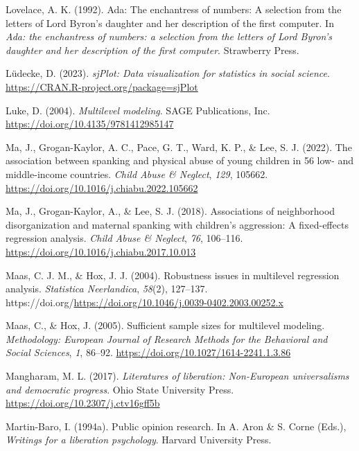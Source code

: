 \documentclass[
  letterpaper,
  DIV=11,
  numbers=noendperiod]{scrreprt}
\newlength{\cslhangindent}
\newenvironment{CSLReferences}[2] %
 {\begin{list}{}{%
  \setlength{\itemindent}{0pt}
  \setlength{\leftmargin}{0pt}
  \setlength{\parsep}{0pt}
  \ifodd #1
   \setlength{\leftmargin}{\cslhangindent}
   \setlength{\itemindent}{-1\cslhangindent}
  \fi
  \setlength{\itemsep}{#2\baselineskip}}}
 {\end{list}}
\begin{document}
\begin{CSLReferences}{1}{0}
Lovelace, A. K. (1992). Ada: The enchantress of numbers: A selection
from the letters of {L}ord {B}yron's daughter and her description of the
first computer. In \emph{Ada: the enchantress of numbers: a selection
from the letters of {L}ord {B}yron's daughter and her description of the
first computer}. Strawberry Press.

Lüdecke, D. (2023). \emph{sjPlot: Data visualization for statistics in
social science}. \url{https://CRAN.R-project.org/package=sjPlot}

Luke, D. (2004). \emph{Multilevel modeling}. SAGE Publications, Inc.
\url{https://doi.org/10.4135/9781412985147}

Ma, J., Grogan-Kaylor, A. C., Pace, G. T., Ward, K. P., \& Lee, S. J.
(2022). {The association between spanking and physical abuse of young
children in 56 low- and middle-income countries}. \emph{Child Abuse \&
Neglect}, \emph{129}, 105662.
\url{https://doi.org/10.1016/j.chiabu.2022.105662}

Ma, J., Grogan-Kaylor, A., \& Lee, S. J. (2018). Associations of
neighborhood disorganization and maternal spanking with children's
aggression: A fixed-effects regression analysis. \emph{Child Abuse \&
Neglect}, \emph{76}, 106--116.
\url{https://doi.org/10.1016/j.chiabu.2017.10.013}

Maas, C. J. M., \& Hox, J. J. (2004). Robustness issues in multilevel
regression analysis. \emph{Statistica Neerlandica}, \emph{58}(2),
127--137.
https://doi.org/\url{https://doi.org/10.1046/j.0039-0402.2003.00252.x}

Maas, C., \& Hox, J. (2005). Sufficient sample sizes for multilevel
modeling. \emph{Methodology: European Journal of Research Methods for
the Behavioral and Social Sciences}, \emph{1}, 86--92.
\url{https://doi.org/10.1027/1614-2241.1.3.86}

Mangharam, M. L. (2017). \emph{Literatures of liberation: Non-{E}uropean
universalisms and democratic progress}. Ohio State University Press.
\url{https://doi.org/10.2307/j.ctv16gff5b}

Martin-Baro, I. (1994a). Public opinion research. In A. Aron \& S. Corne
(Eds.), \emph{Writings for a liberation psychology}. Harvard University
Press.


\end{CSLReferences}
\end{document}
